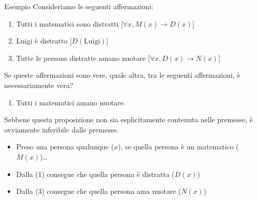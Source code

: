 \documentclass[aspectratio=169,10pt]{beamer}
\newcommand{\xmark}{{\color{red}{\ding{55}}}}
\begin{document}
\begin{frame}{Esempio}
 Consideriamo le seguenti affermazioni:
 \begin{enumerate}
\item Tutti i matematici sono distratti [\alert{$\forall x, M(x) \to D(x)$}]
\item Luigi è distratto [\alert{$D(\text{Luigi})$}]
\item Tutte le persone distratte amano nuotare [\alert{$\forall x, D(x) \to N(x)$}]
\end{enumerate}
Se queste affermazioni sono vere, quale altra, tra le seguenti affermazioni, è necessariamente vera?
\begin{enumerate}[A]\addtocounter{enumi}{4}
\item Tutti i matematici amano nuotare.  
\end{enumerate}
\pause
\medskip
Sebbene questa proposizione non sia esplicitamente contenuta nelle premesse, è ovviamente inferibile dalle premesse.
\begin{itemize}
    \item Preso una persona qualunque ($x$), se quella persona è un matematico ($M(x)$)\ldots
    \item Dalla (1) consegue che quella persona è distratta ($D(x)$)
    \item Dalla (3) consegue che quella persona ama nuotare ($N(x)$)
\end{itemize}
\end{frame}

\end{document}

